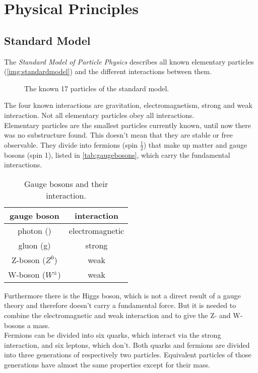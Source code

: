 \section{Physical Principles}
\subsection{Standard Model}
The \emph{Standard Model of Particle Physics} describes all known elementary particles (\autoref{img:standardmodel}) and the different 
interactions between them.
\begin{figure}[H]
        \centering
        \def\svgwidth{0.55\textwidth}
       
        \caption{The known 17 particles of the standard model.}
        \label{img:standardmodel}
\end{figure}
The four known interactions are gravitation, electromagnetism, strong and weak interaction. Not all elementary particles obey all interactions.\\
Elementary particles are the smallest particles currently known, until now there was no substructure found. 
This doesn't mean that they are stable or free observable. They divide into fermions (spin $\frac{1}{2}$) that make up matter and 
gauge bosons (spin 1), listed in \autoref{tab:gaugebosons}, which carry the fundamental interactions. 
\begin{table}[H]
\caption{Gauge bosons and their interaction.}
\begin{center}
\begin{tabular}{|c|c|}
	\hline
	gauge boson 		& interaction			\\ \hline \hline
	photon (\textgamma) & electromagnetic 		\\ \hline
	gluon (g) 			& strong				\\ \hline
	Z-boson ($Z^0$)		& weak					\\ \hline
	W-boson ($W^\pm$)	& weak					\\ \hline
\end{tabular}
\end{center}
\label{tab:gaugebosons}
\end{table}
Furthermore there is the Higgs boson, which is not a direct result of a gauge theory and 
therefore doesn't carry a fundamental force. But it is needed to combine the electromagnetic and weak interaction and to give the Z- and W-bosons
a mass. \\
Fermions can be divided into six quarks, which interact via the strong interaction, and six leptons, which don't. Both quarks and fermions are 
divided into three generations of respectively two particles. Equivalent particles of those generations have almost the same properties except for 
their mass.
